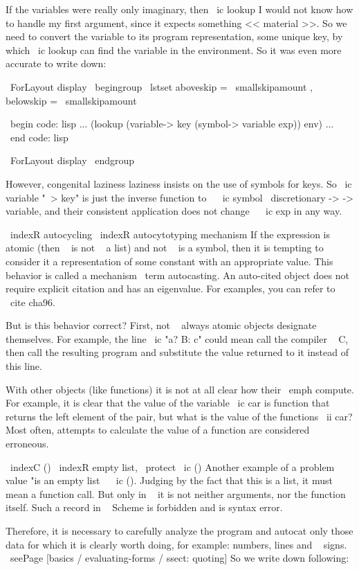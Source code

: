 If the variables were really only imaginary, then \ ic {lookup}
I would not know how to handle my first argument, since it expects something
<< material >>. So we need to convert the variable to its program
representation, some unique key, by which \ ic {lookup} can
find the variable in the environment. So it was even more accurate to write down:

\ ForLayout {display} { \ begingroup
\ lstset {aboveskip = \ smallskipamount , belowskip = \ smallskipamount }}

\ begin {code: lisp}
... (lookup (variable-> key (symbol-> variable exp)) env) ...
\ end {code: lisp}

\ ForLayout {display} { \ endgroup }

However, congenital laziness laziness insists on the use of symbols for
keys. So \ ic {variable "~> key}" is just the inverse function
to ~ \ ic {symbol \ discretionary {->} {} {->} variable}, and their consistent application
does not change ~ \ ic {exp} in any way.

\ indexR {autocycling} \ indexR {autocytotyping mechanism}
If the expression is atomic (then ~ is not ~ a list) and not ~ is a symbol,
then it is tempting to consider it a representation of some constant
with an appropriate value. This behavior is called a mechanism
\ term {autocasting}. An auto-cited object does not require explicit citation and
has an eigenvalue. For examples, you can refer to ~ \ cite {cha96}.

But is this behavior correct? First, not ~ always atomic
objects designate themselves. For example, the line \ ic {"a? B: c"} could mean
call the compiler ~ C, then call the resulting program and substitute
the value returned to it instead of this line.

With other objects (like functions) it is not at all clear how their
\ emph {compute}. For example, it is clear that the value of the variable \ ic {car} is
function that returns the left element of the pair, but what is the value of the
functions \ ii {car}? Most often, attempts to calculate the value of a function are considered
erroneous.

\ indexC {()} \ indexR {empty list, \ protect \ ic {()}}
Another example of a problem value "is an empty list ~ \ ic {()}. Judging by the fact that
this is a list, it must mean a function call. But only in ~ it is not
neither arguments, nor the function itself. Such a record in ~ Scheme is forbidden and is
syntax error.

Therefore, it is necessary to carefully analyze the program and autocat
only those data for which it is clearly worth doing, for example: numbers, lines
and ~ signs. \ seePage [basics / evaluating-forms / ssect: quoting] So we write down
following:

